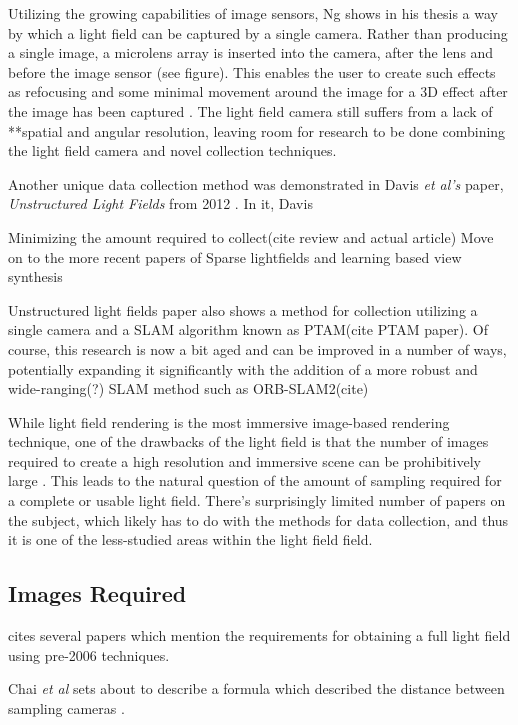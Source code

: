 \documentclass[12pt]{report}
\begin{document}
Utilizing the growing capabilities of image sensors, Ng shows in his thesis a way by which a light field can be captured by a single camera. Rather than producing a single image, a microlens array is inserted into the camera, after the lens and before the image sensor (see figure). This enables the user to create such effects as refocusing and some minimal movement around the image for a 3D effect after the image has been captured \cite{Ng06}. The light field camera still suffers from a lack of **spatial and angular resolution, leaving room for research to be done combining the light field camera and novel collection techniques.

Another unique data collection method was demonstrated in Davis \emph{et al's} paper, \emph{Unstructured Light Fields} from 2012 \cite{Davis12}. In it, Davis 

Minimizing the amount required to collect(cite review and actual article)
Move on to the more recent papers of Sparse lightfields and learning 
based view synthesis

Unstructured light fields paper also shows a method for collection utilizing a single camera and a SLAM algorithm known as PTAM(cite PTAM paper). Of course, this research is now a bit aged and can be improved in a number of ways, potentially expanding it significantly with the addition of a more robust and wide-ranging(?) SLAM method such as ORB-SLAM2(cite)

\cite{Ng06}
\cite{Davis12}
\cite{Oberlin16}


While light field rendering is the most immersive image-based rendering technique, one of the drawbacks of the light field is that the number of images required to create a high resolution and immersive scene can be prohibitively large \cite{Anderson16}. This leads to the natural question of the amount of sampling required for a complete or usable light field. There's surprisingly limited number of papers on the subject, which likely has to do with the methods for data collection, and thus it is one of the less-studied areas within the light field field.

\subsection*{Images Required}

\cite{Levoy06a} cites several papers which mention the requirements for obtaining a full light field using pre-2006 techniques. 

Chai \emph{et al} sets about to describe a formula which described the distance between sampling cameras \cite{Chai00}.
\end{document}
